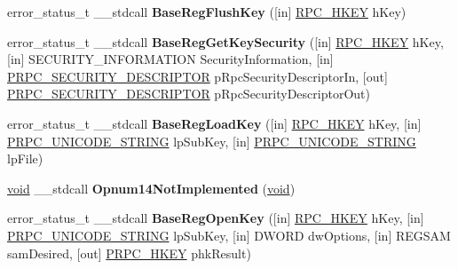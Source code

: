 \begin{DoxyCompactItemize}
\item 
\mbox{\label{interfacewinreg_a73fc39bd1b56ad6d2bf413dfbd74f3c6}} 
error\+\_\+status\+\_\+t \+\_\+\+\_\+stdcall {\bfseries Base\+Reg\+Flush\+Key} (\mbox{[}in\mbox{]} \hyperlink{interfacevoid}{R\+P\+C\+\_\+\+H\+K\+EY} h\+Key)
\item 
\mbox{\label{interfacewinreg_a39976ebe3fd651480cfeebb942c4cdaa}} 
error\+\_\+status\+\_\+t \+\_\+\+\_\+stdcall {\bfseries Base\+Reg\+Get\+Key\+Security} (\mbox{[}in\mbox{]} \hyperlink{interfacevoid}{R\+P\+C\+\_\+\+H\+K\+EY} h\+Key, \mbox{[}in\mbox{]} S\+E\+C\+U\+R\+I\+T\+Y\+\_\+\+I\+N\+F\+O\+R\+M\+A\+T\+I\+ON Security\+Information, \mbox{[}in\mbox{]} \hyperlink{struct___r_p_c___s_e_c_u_r_i_t_y___d_e_s_c_r_i_p_t_o_r}{P\+R\+P\+C\+\_\+\+S\+E\+C\+U\+R\+I\+T\+Y\+\_\+\+D\+E\+S\+C\+R\+I\+P\+T\+OR} p\+Rpc\+Security\+Descriptor\+In, \mbox{[}out\mbox{]} \hyperlink{struct___r_p_c___s_e_c_u_r_i_t_y___d_e_s_c_r_i_p_t_o_r}{P\+R\+P\+C\+\_\+\+S\+E\+C\+U\+R\+I\+T\+Y\+\_\+\+D\+E\+S\+C\+R\+I\+P\+T\+OR} p\+Rpc\+Security\+Descriptor\+Out)
\item 
\mbox{\label{interfacewinreg_a5239a20fb7d4e56dbb233c28f0a112cb}} 
error\+\_\+status\+\_\+t \+\_\+\+\_\+stdcall {\bfseries Base\+Reg\+Load\+Key} (\mbox{[}in\mbox{]} \hyperlink{interfacevoid}{R\+P\+C\+\_\+\+H\+K\+EY} h\+Key, \mbox{[}in\mbox{]} \hyperlink{struct___r_p_c___u_n_i_c_o_d_e___s_t_r_i_n_g}{P\+R\+P\+C\+\_\+\+U\+N\+I\+C\+O\+D\+E\+\_\+\+S\+T\+R\+I\+NG} lp\+Sub\+Key, \mbox{[}in\mbox{]} \hyperlink{struct___r_p_c___u_n_i_c_o_d_e___s_t_r_i_n_g}{P\+R\+P\+C\+\_\+\+U\+N\+I\+C\+O\+D\+E\+\_\+\+S\+T\+R\+I\+NG} lp\+File)
\item 
\mbox{\label{interfacewinreg_afd80c7f47054f2b676542d6436004bc9}} 
\hyperlink{interfacevoid}{void} \+\_\+\+\_\+stdcall {\bfseries Opnum14\+Not\+Implemented} (\hyperlink{interfacevoid}{void})
\item 
\mbox{\label{interfacewinreg_a072e0bb267b6aa9f87c0fb9be6605d5c}} 
error\+\_\+status\+\_\+t \+\_\+\+\_\+stdcall {\bfseries Base\+Reg\+Open\+Key} (\mbox{[}in\mbox{]} \hyperlink{interfacevoid}{R\+P\+C\+\_\+\+H\+K\+EY} h\+Key, \mbox{[}in\mbox{]} \hyperlink{struct___r_p_c___u_n_i_c_o_d_e___s_t_r_i_n_g}{P\+R\+P\+C\+\_\+\+U\+N\+I\+C\+O\+D\+E\+\_\+\+S\+T\+R\+I\+NG} lp\+Sub\+Key, \mbox{[}in\mbox{]} D\+W\+O\+RD dw\+Options, \mbox{[}in\mbox{]} R\+E\+G\+S\+AM sam\+Desired, \mbox{[}out\mbox{]} \hyperlink{interfacevoid}{P\+R\+P\+C\+\_\+\+H\+K\+EY} phk\+Result)

\end{DoxyCompactItemize}

